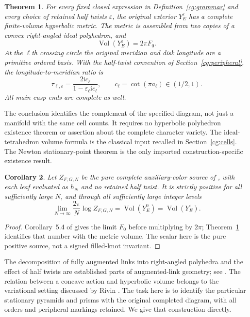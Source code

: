 \documentclass[11pt]{article}
\numberwithin{equation}{section}
\newtheorem{theorem}{Theorem}[section]
\newtheorem{corollary}[theorem]{Corollary}
\theoremstyle{definition}\newtheorem{definition}[theorem]{Definition}
\theoremstyle{remark}\newtheorem{remark}[theorem]{Remark}
\newcommand{\ii}{\mathrm i}
\newcommand{\Vol}{\operatorname{Vol}}
\newcommand{\eps}{\varepsilon}
\begin{document}
\begin{theorem}\label{cg:main}
For every fixed closed expression in Definition~\ref{cg:grammar}
and every choice of retained half twists $\eps$, the original exterior
$Y^\eps_E$ has a complete finite-volume hyperbolic metric. The metric
is assembled from two copies of a convex right-angled ideal
polyhedron, and
\begin{equation}\label{cg:volume}
 \Vol(Y^\eps_E)=2\pi F_0.
\end{equation}
At the $\ell$th crossing circle the original meridian and disk longitude
are a primitive ordered basis. With the half-twist convention of
Section~\ref{cg:peripheral}, the longitude-to-meridian ratio is
\begin{equation}\label{cg:cusp-shape}
 \tau_{\ell,\eps}
 =\frac{2\ii c_\ell}{1-\eps_\ell\ii c_\ell},
 \qquad c_\ell=\cot(\pi a_\ell)\in(1/2,1).
\end{equation}
All main cusp ends are complete as well.
\end{theorem}

The conclusion identifies the complement of the specified diagram,
not just a manifold with the same cell counts. It requires no
hyperbolic polyhedron existence theorem or assertion about the
complete character variety. The ideal-tetrahedron volume formula is
the classical input recalled in Section~\ref{cg:cells}. The Newton
stationary-point theorem is the only imported
construction-specific existence result.

\begin{corollary}\label{cg:source-volume}
Let $Z_{F,G,N}$ be the pure complete auxiliary-color source of
\cite[Section~2]{Newton}, with each leaf evaluated as $h_N$ and no
retained half twist. It is strictly positive for all sufficiently
large $N$, and through all sufficiently large integer levels
\[
 \lim_{N\to\infty}\frac{2\pi}{N}\log Z_{F,G,N}
       =\Vol(Y^0_E)=\Vol(Y^\eps_E).
 \]
\end{corollary}
\begin{proof}
Corollary~5.4 of \cite{Newton} gives the limit $F_0$ before multiplying
by $2\pi$; Theorem~\ref{cg:main} identifies that number with the metric
volume. The scalar here is the pure positive source, not a signed
filled-knot invariant.
\end{proof}

The decomposition of fully augmented links into right-angled
polyhedra and the effect of half twists are established parts of
augmented-link geometry; see \cite{Purcell}. The relation between a
concave action and hyperbolic volume belongs to the variational
setting discussed by Rivin \cite{Rivin}. The task here is to identify
the particular stationary pyramids and prisms with the original
completed diagram, with all orders and peripheral markings retained.
We give that construction directly.
\end{document}
